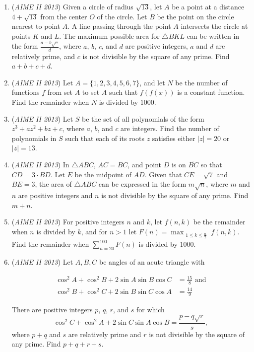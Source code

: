 \begin{enumerate}
 

	\item (\textit{AIME II 2013}) Given a circle of radius $\sqrt{13}$, let $A$ be a point at a distance $4 + \sqrt{13}$ from the center $O$ of the circle. Let $B$ be the point on the circle nearest to point $A$. A line passing through the point $A$ intersects the circle at points $K$ and $L$. The maximum possible area for $\triangle BKL$ can be written in the form $\frac{a - b\sqrt{c}}{d}$, where $a$, $b$, $c$, and $d$ are positive integers, $a$ and $d$ are relatively prime, and $c$ is not divisible by the square of any prime. Find $a+b+c+d$.


 

	\item (\textit{AIME II 2013}) Let $A = \{1, 2, 3, 4, 5, 6, 7\}$, and let $N$ be the number of functions $f$ from set $A$ to set $A$ such that $f(f(x))$ is a constant function. Find the remainder when $N$ is divided by $1000$.


 

	\item (\textit{AIME II 2013}) Let $S$ be the set of all polynomials of the form $z^3 + az^2 + bz + c$, where $a$, $b$, and $c$ are integers. Find the number of polynomials in $S$ such that each of its roots $z$ satisfies either $|z| = 20$ or $|z| = 13$.


 

	\item (\textit{AIME II 2013}) In $\triangle ABC$, $AC = BC$, and point $D$ is on $\overline{BC}$ so that $CD = 3\cdot BD$. Let $E$ be the midpoint of $\overline{AD}$. Given that $CE = \sqrt{7}$ and $BE = 3$, the area of $\triangle ABC$ can be expressed in the form $m\sqrt{n}$, where $m$ and $n$ are positive integers and $n$ is not divisible by the square of any prime. Find $m+n$.


 

	\item (\textit{AIME II 2013}) For positive integers $n$ and $k$, let $f(n, k)$ be the remainder when $n$ is divided by $k$, and for $n > 1$ let $F(n) = \max_{\substack{1\le k\le \frac{n}{2}}} f(n, k)$. Find the remainder when $\sum\limits_{n=20}^{100} F(n)$ is divided by $1000$.


 

	\item (\textit{AIME II 2013}) Let $A,B,C$ be angles of an acute triangle with

 \begin{align*} \cos^2 A + \cos^2 B + 2 \sin A \sin B \cos C &= \frac{15}{8} \text{ and} \\ \cos^2 B + \cos^2 C + 2 \sin B \sin C \cos A &= \frac{14}{9} \end{align*}

There are positive integers $p$, $q$, $r$, and $s$ for which 
 \[\cos^2 C + \cos^2 A + 2 \sin C \sin A \cos B = \frac{p-q\sqrt{r}}{s},\] where $p+q$ and $s$ are relatively prime and $r$ is not divisible by the square of any prime.  Find $p+q+r+s$.


 

\end{enumerate}